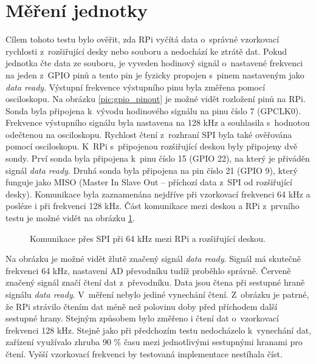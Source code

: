 \section{Měření jednotky}
Cílem tohoto testu bylo ověřit, zda RPi vyčítá data o~správné vzorkovací rychlosti z~rozšiřující desky nebo souboru a nedochází ke ztrátě dat. Pokud jednotka čte data ze souboru, je vyveden hodinový signál o~nastavené frekvenci na jeden z~GPIO pinů a tento pin je fyzicky propojen s~pinem nastaveným jako \textit{data ready}. Výstupní frekvence výstupního pinu byla změřena pomocí osciloskopu. Na obrázku \ref{pic:gpio_pinout} je možné vidět rozložení pinů na RPi. Sonda byla připojena k~vývodu hodinového signálu na pinu číslo 7 (GPCLK0). Frekvence výstupního signálu byla nastavena na 128 kHz a souhlasila s~hodnotou odečtenou na osciloskopu. Rychlost čtení z~rozhraní SPI byla také ověřována pomocí osciloskopu. K~RPi s~připojenou rozšiřující deskou byly připojeny dvě sondy. Prví sonda byla připojena k~pinu číslo 15 (GPIO 22), na který je přiváděn signál \textit{data ready}. Druhá sonda byla připojena na pin číslo 21 (GPIO 9), který funguje jako MISO (Master In Slave Out -- příchozí data z~SPI od rozšiřující desky). Komunikace byla zaznamenána nejdříve při vzorkovací frekvenci 64 kHz a posléze i při frekvenci 128 kHz. Část komunikace mezi deskou a RPi z~prvního testu je možné vidět na obrázku \ref{pic:osciloscop}.

\begin{figure}[h]
  \centering
  \caption{Komunikace přes SPI při 64 kHz mezi RPi a rozšiřující deskou.}\label{pic:osciloscop}
\end{figure}

Na obrázku je možné vidět žlutě značený signál \textit{data ready}. Signál má skutečně frekvenci 64 kHz, nastavení AD převodníku tudíž proběhlo správně. Červeně značený signál značí čtení dat z~převodníku. Data jsou čtena při sestupné hraně signálu \textit{data ready}. V~měření nebylo jediné vynechání čtení. Z~obrázku je patrné, že RPi strávilo čtením dat méně než polovinu doby před příchodem další sestupné hrany. Stejným způsobem bylo změřeno i čtení dat o~vzorkovací frekvenci 128 kHz. Stejně jako při předchozím testu nedocházelo k~vynechání dat, zařízení využívalo zhruba 90 \% času mezi jednotlivými sestupnými hranami pro čtení. Vyšší vzorkovací frekvenci by testovaná implementace nestíhala číst.

